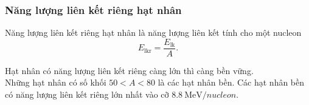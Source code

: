 \begin{tomtat}
	\subsubsection{Năng lượng liên kết riêng hạt nhân}
	\begin{dn}
		Năng lượng liên kết riêng hạt nhân là năng lượng liên kết tính cho một nucleon
		\begin{equation}
			E_\text{lkr}=\dfrac{E_\text{lk}}{A}.
		\end{equation}
	\end{dn}
	\begin{note}
		Hạt nhân có năng lượng liên kết riêng càng lớn thì càng bền vững.\\ 
		Những hạt nhân có số khối $50<A<80$ là các hạt nhân bền. Các hạt nhân bền có năng lượng liên kết riêng lớn nhất vào cỡ $\SI{8.8}{\mega\electronvolt/nucleon}$.
	\end{note}
\end{tomtat}
